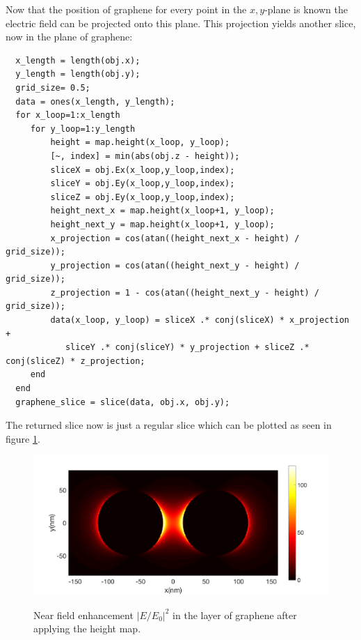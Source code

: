 Now that the position of graphene for every point in the $x,y$-plane is known the electric field can be projected onto this plane. This projection yields another slice, now in the plane of graphene:

\begin{verbatim}
  x_length = length(obj.x);
  y_length = length(obj.y);
  grid_size= 0.5;
  data = ones(x_length, y_length);
  for x_loop=1:x_length
     for y_loop=1:y_length
         height = map.height(x_loop, y_loop);
         [~, index] = min(abs(obj.z - height));
         sliceX = obj.Ex(x_loop,y_loop,index);
         sliceY = obj.Ey(x_loop,y_loop,index);
         sliceZ = obj.Ey(x_loop,y_loop,index);
         height_next_x = map.height(x_loop+1, y_loop);
         height_next_y = map.height(x_loop+1, y_loop);
         x_projection = cos(atan((height_next_x - height) / grid_size));
         y_projection = cos(atan((height_next_y - height) / grid_size));
         z_projection = 1 - cos(atan((height_next_y - height) / grid_size));
         data(x_loop, y_loop) = sliceX .* conj(sliceX) * x_projection +
            sliceY .* conj(sliceY) * y_projection + sliceZ .* conj(sliceZ) * z_projection;
     end
  end
  graphene_slice = slice(data, obj.x, obj.y);
\end{verbatim}

The returned slice now is just a regular slice which can be plotted as seen in figure \ref{projected}.

\begin{figure}[!h]
  \centering
  \includegraphics[width=\textwidth]{./images/graphene-layer.png}
  \label{projected}
  \caption{Near field enhancement $|E/E_0|^2$ in the layer of graphene after applying the height map.}
\end{figure}

